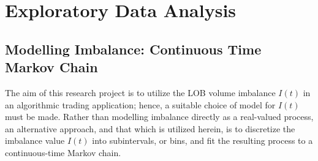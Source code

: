 \chapter{Exploratory Data Analysis}

\section{Modelling Imbalance: Continuous Time Markov Chain}
The aim of this research project is to utilize the LOB volume imbalance $I(t)$ in an algorithmic trading application; hence, a suitable choice of model for $I(t)$ must be made. Rather than modelling imbalance directly as a real-valued process, an alternative approach, and that which is utilized herein, is to discretize the imbalance value $I(t)$ into subintervals, or bins, and fit the resulting process to a continuous-time Markov chain.


